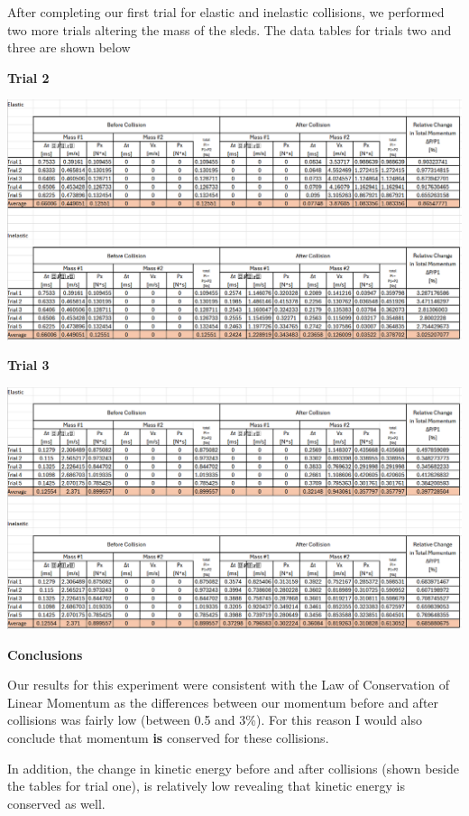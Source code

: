\documentclass[12pt]{article}
\begin{document}
After completing our first trial for elastic and inelastic collisions, we performed two more trials
altering the mass of the sleds. The data tables for trials two and three are shown below

\textbf{Trial 2}
\begin{center}
   \includegraphics[scale=0.6]{trial_2.png}
\end{center}

\textbf{Trial 3}
\begin{center}
   \includegraphics[scale=0.6]{trial_3.png}
\end{center}

\newpage

\textbf{Conclusions}

Our results for this experiment were consistent with the Law of Conservation of Linear Momentum
as the differences between our momentum before and after collisions was fairly low (between 0.5 and 3\%).
For this reason I would also conclude that momentum \textbf{is} conserved for these collisions.

In addition, the change in kinetic energy before and after collisions (shown beside the tables for trial one),
is relatively low revealing that kinetic energy is conserved as well.
\end{document}
